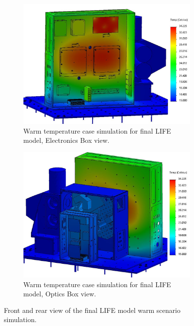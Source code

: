 \begin{figure}
    \centering
    \begin{subfigure}[h]{0.8\textwidth}
        \centering
        \includegraphics[width=\textwidth]{chap3_images/LIFE_V5_final_images/Iteration_3_ebox_no_labels_FIXED.png}
        \caption{Warm temperature case simulation for final LIFE model, Electronics Box view.}
        \label{fig:LIFE_V5_FINAL_TA_WARM_EBOX}
    \end{subfigure}
    \begin{subfigure}[h]{0.8\textwidth}
        \centering
        \includegraphics[width=\textwidth]{chap3_images/LIFE_V5_final_images/Iteration_3_no_labels_FIXED.png}
        \caption{Warm temperature case simulation for final LIFE model, Optics Box view.}
        \label{fig:LIFE_V5_FINAL_TA_WARM_OBOX}
    \end{subfigure}
    \caption{Front and rear view of the final LIFE model warm scenario simulation.}
    \label{LIFE_V5_FINAL_TA_WARM}
\end{figure}

